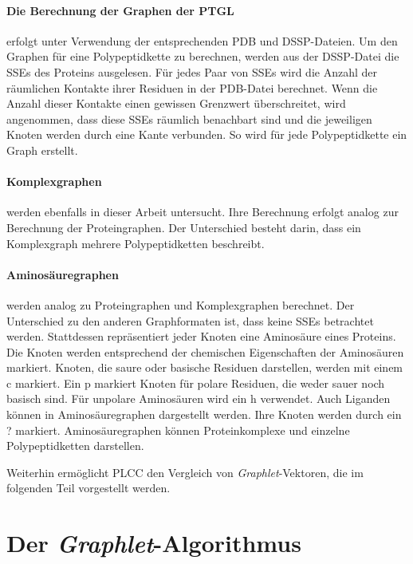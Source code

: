\documentclass{report}
\begin{document}
\paragraph{Die Berechnung der Graphen der PTGL}

erfolgt unter Verwendung der entsprechenden PDB und DSSP-Dateien. Um den Graphen f\"ur eine Polypeptidkette zu berechnen, werden aus der DSSP-Datei die SSEs des Proteins ausgelesen. F\"ur jedes Paar von SSEs wird die Anzahl der r\"aumlichen Kontakte ihrer Residuen in der PDB-Datei berechnet. Wenn die Anzahl dieser Kontakte einen gewissen Grenzwert \"uberschreitet, wird angenommen, dass diese SSEs r\"aumlich benachbart sind und die jeweiligen Knoten werden durch eine Kante verbunden. So wird f\"ur jede Polypeptidkette ein Graph erstellt.

\paragraph{Komplexgraphen}

werden ebenfalls in dieser Arbeit untersucht. Ihre Berechnung erfolgt analog zur Berechnung der Proteingraphen. Der Unterschied besteht darin, dass ein Komplexgraph mehrere Polypeptidketten beschreibt.

\paragraph{Aminos\"auregraphen} werden analog zu Proteingraphen und Komplexgraphen berechnet. Der Unterschied zu den anderen Graphformaten ist, dass keine SSEs betrachtet werden. Stattdessen repr\"asentiert jeder Knoten eine Aminos\"aure eines Proteins. Die Knoten werden entsprechend der chemischen Eigenschaften der Aminos\"auren markiert. Knoten, die saure oder basische Residuen darstellen, werden mit einem c markiert. Ein p markiert Knoten f\"ur polare Residuen, die weder sauer noch basisch sind. F\"ur unpolare Aminos\"auren wird ein h verwendet. Auch Liganden k\"onnen in Aminos\"auregraphen dargestellt werden. Ihre Knoten werden durch ein ? markiert. Aminos\"auregraphen k\"onnen Proteinkomplexe und einzelne Polypeptidketten darstellen.


Weiterhin erm\"oglicht PLCC den Vergleich von \textit{Graphlet}-Vektoren, die im folgenden Teil vorgestellt werden.


\section{Der \textit{Graphlet}-Algorithmus}
\end{document}
